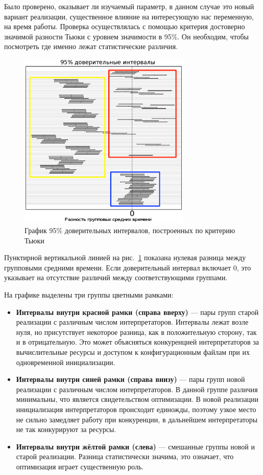 \clearpage
Было проверено, оказывает ли изучаемый параметр,
в данном случае это новый вариант реализации,
существенное влияние на интересующую нас
переменную, на время работы.
Проверка осуществлялась с помощью
критерия достоверно значимой
разности Тьюки
с уровнем значимости в 95\%.
Он необходим, чтобы посмотреть
где именно лежат статистические различия.

\begin{figure}[!h]
\centering
\includegraphics[width=0.73\textwidth]{tukey}
\caption{График 95\% доверительных интервалов,
построенных по критерию Тьюки}
\label{fig:tukey}
\end{figure}

Пунктирной вертикальной линией на рис.~\ref{fig:tukey}
показана нулевая разница между групповыми средними времени.
Если доверительный интервал включает 0,
это указывает на отсутствие различий
между соответствующими группами.

На графике выделены три группы цветными рамками:
\begin{itemize}
    \item \textbf{Интервалы внутри красной рамки (справа вверху)} ---
        пары групп старой реализации с различным числом интерпретаторов.
        Интервалы лежат возле нуля, но присутствует
        некоторое разница, как в положительную сторону,
        так и в отрицательную. Это может объясняться
        конкуренцией интерпретаторов
        за вычислительные ресурсы и доступом к конфигурационным файлам
        при их одновременной инициализации.
    \item \textbf{Интервалы внутри синей рамки (справа внизу)} ---
        пары групп новой реализации с различным числом интерпретаторов.
        В данной группе различия минимальны,
        что является свидетельством оптимизации.
        В новой реализации инициализация интерпретаторов
        происходит единожды, поэтому
        узкое место не сильно замедляет работу
        при конкуренции, в дальнейшем
        интерпретаторы не так конкурируют за ресурсы.
    \item \textbf{Интервалы внутри жёлтой рамки (слева)} ---
        смешанные группы новой и старой реализации.
        Разница статистически значима,
        это означает, что оптимизация играет существенную роль.
\end{itemize}

